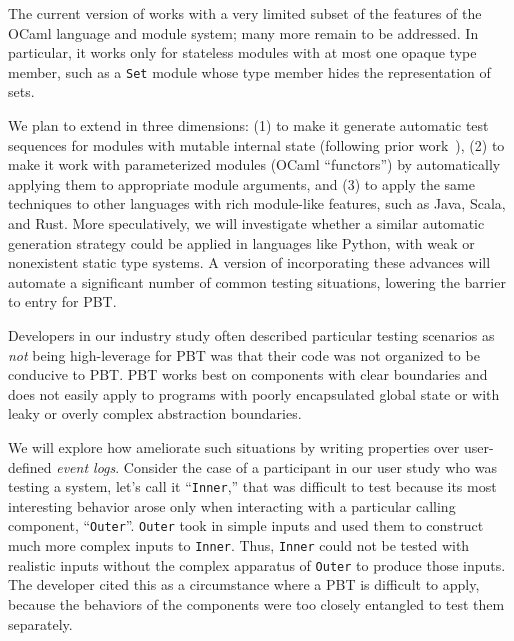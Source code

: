 The current version of {\Mica} works with a very limited subset of
the features of the OCaml language and
module system; many more remain to be addressed. In particular, it
works only for stateless modules with at most one opaque type
member, such as a {\tt Set} module whose type member hides the
representation of sets.

We plan to extend {\Mica} in three dimensions: (1) to make it generate automatic
test sequences for modules with mutable internal state (following prior work~\cite{midtgaard_2020,monolith}), (2) to
make it work with parameterized modules (OCaml ``functors'') by
automatically applying them to appropriate module arguments, and (3)
to apply the same techniques to other languages with rich module-like
features, such as Java, Scala, and Rust.  More speculatively, we will
investigate whether a similar automatic generation strategy could be
applied in languages like Python, with weak or nonexistent static type
systems.
%
A version of \Mica{} incorporating these advances will automate a
significant number of common testing situations, lowering the barrier
to entry for PBT.


%
Developers in our industry study often described particular
testing scenarios as {\em not} being high-leverage for PBT was that
their code was not organized to be conducive to
PBT.  PBT works best on components with clear boundaries and does not
easily apply to programs with
poorly encapsulated global state or with leaky or overly complex abstraction
boundaries.

We will explore
how ameliorate such situations by writing properties over user-defined
{\em event logs}. Consider
the case of a participant in our user
study who was testing
a system, let's call it ``\lstinline{Inner},'' that  was difficult to
test because
its most interesting behavior arose only when interacting with a particular calling
component, ``\lstinline{Outer}''.
\lstinline{Outer} took in simple inputs and used them to construct
much more complex inputs to \lstinline{Inner}. Thus, \lstinline{Inner}
could not be tested with
realistic inputs without the complex apparatus of \lstinline{Outer} to
produce those inputs.  The developer cited this as a circumstance where a
PBT is difficult to apply, because the behaviors of the components were too
closely entangled to test them separately.

